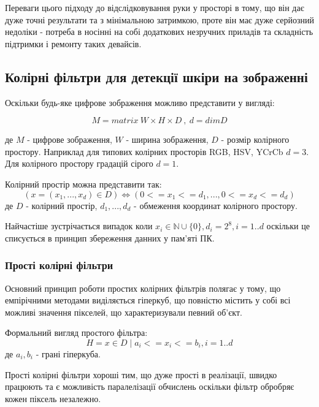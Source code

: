 Переваги цього підходу до відслідковування руки у просторі в тому, що він дає дуже точні результати та з мінімальною затримкою, проте він має дуже серйозний недоліки - потреба в носінні на собі додаткових незручних приладів та складність підтримки і ремонту таких девайсів.

\subsection{Колірні фільтри для детекції шкіри на зображенні}

Оскільки будь-яке цифрове зображення можливо представити у вигляді:

\begin{equation}
	\label{eq:digital_image_representation}
	M = matrix \: W \times H \times D \: , \: d = dimD
\end{equation}

де $M$ - цифрове зображення, $W$ - ширина зображення, $D$ - розмір колірного простору.
Наприклад для типових колірних просторів RGB, HSV, YCrCb $d = 3$. Для колірного простору градацій сірого $d = 1$.

Колірний простір можна представити так:
\begin{equation}
	\label{eq:color_space_representation}
	( x=(x_1,...,x_d) \in D) \Leftrightarrow ( 0<=x_1<=d_1, ... , 0<=x_d<=d_d )	
\end{equation}
де $D$ - колірний простір, $d_1,...,d_d$ - обмеження координат колірного простору.

Найчастіше зустрічається випадок коли $x_i \in \mathbb{N} \cup \{0\}, d_i = 2^8 , i=1..d$ оскільки це списується в принцип збереження данних у пам'яті ПК.


\subsubsection{Прості колірні фільтри}
Основний принцип роботи простих колірних фільтрів полягає у тому, що емпірічними методами виділяється гіперкуб, що повністю містить у собі всі можливі значення пікселей, що характеризували певний об'єкт.

Формальний вигляд простого фільтра:
\begin{equation}
	\label{eq:simple_color_filter}
	H = {x \in D \mid a_i <= x_i <= b_i, i=1..d}
\end{equation}
	де $a_i,b_i$ - грані гіперкуба.
	
Прості колірні фільтри хороші тим, що дуже прості в реалізації, швидко працюють та є можливість паралелізації обчислень оскільки фільтр обробряє кожен піксель незалежно.

